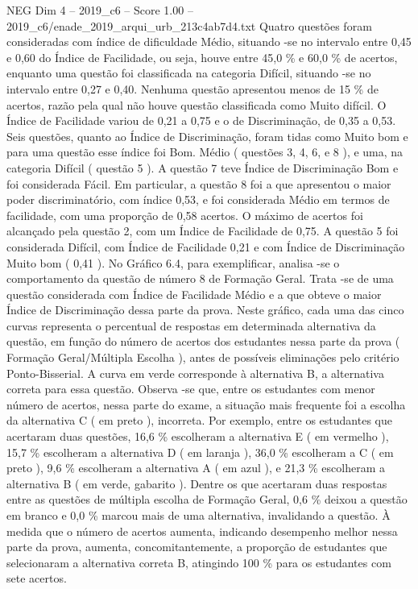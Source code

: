 \begin{textsample}{NEG Dim 4 – 2019\_c6 – Score 1.00 – 2019\_c6/enade\_2019\_arqui\_urb\_213c4ab7d4.txt}
Quatro questões foram consideradas com índice de dificuldade Médio, situando -se no intervalo entre 0,45 e 0,60 do Índice de Facilidade, ou seja, houve entre 45,0 \% e 60,0 \% de acertos, enquanto uma questão foi classificada na categoria Difícil, situando -se no intervalo entre 0,27 e 0,40.
Nenhuma questão apresentou menos de 15 \% de acertos, razão pela qual não houve questão classificada como Muito difícil.
O Índice de Facilidade variou de 0,21 a 0,75 e o de Discriminação, de 0,35 a 0,53.
Seis questões, quanto ao Índice de Discriminação, foram tidas como Muito bom e para uma questão esse índice foi Bom.
Médio ( questões 3, 4, 6, e 8 ), e uma, na categoria Difícil ( questão 5 ).
A questão 7 teve Índice de Discriminação Bom e foi considerada Fácil.
Em particular, a questão 8 foi a que apresentou o maior poder discriminatório, com índice 0,53, e foi considerada Médio em termos de facilidade, com uma proporção de 0,58 acertos.
O máximo de acertos foi alcançado pela questão 2, com um Índice de Facilidade de 0,75.
A questão 5 foi considerada Difícil, com Índice de Facilidade 0,21 e com Índice de Discriminação Muito bom ( 0,41 ).
No Gráfico 6.4, para exemplificar, analisa -se o comportamento da questão de número 8 de Formação Geral.
Trata -se de uma questão considerada com Índice de Facilidade Médio e a que obteve o maior Índice de Discriminação dessa parte da prova.
Neste gráfico, cada uma das cinco curvas representa o percentual de respostas em determinada alternativa da questão, em função do número de acertos dos estudantes nessa parte da prova ( Formação Geral/Múltipla Escolha ), antes de possíveis eliminações pelo critério Ponto-Bisserial.
A curva em verde corresponde à alternativa B, a alternativa correta para essa questão.
Observa -se que, entre os estudantes com menor número de acertos, nessa parte do exame, a situação mais frequente foi a escolha da alternativa C ( em preto ), incorreta.
Por exemplo, entre os estudantes que acertaram duas questões, 16,6 \% escolheram a alternativa E ( em vermelho ), 15,7 \% escolheram a alternativa D ( em laranja ), 36,0 \% escolheram a C ( em preto ), 9,6 \% escolheram a alternativa A ( em azul ), e 21,3 \% escolheram a alternativa B ( em verde, gabarito ).
Dentre os que acertaram duas respostas entre as questões de múltipla escolha de Formação Geral, 0,6 \% deixou a questão em branco e 0,0 \% marcou mais de uma alternativa, invalidando a questão.
À medida que o número de acertos aumenta, indicando desempenho melhor nessa parte da prova, aumenta, concomitantemente, a proporção de estudantes que selecionaram a alternativa correta B, atingindo 100 \% para os estudantes com sete acertos.

\end{textsample}
